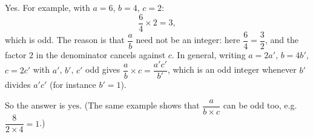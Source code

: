 Yes. For example, with $a=6$, $b=4$, $c=2$:
\[
\dfrac{6}{4}\times2=3,
\]
which is odd. The reason is that $\dfrac {a}{b}$ need not be an integer: here $\dfrac{6}{4}=\dfrac{3}{2}$, and the factor $2$ in the denominator cancels against $c$. In general, writing $a=2a'$, $b=4b'$, $c=2c'$ with $a'$, $b'$, $c'$ odd gives $\dfrac {a}{b}\times c=\dfrac{a'c'}{b'}$, which is an odd integer whenever $b'$ divides $a'c'$ (for instance $b'=1$).

So the answer is $\boxed{\text{yes}}$. (The same example shows that $\dfrac{a}{b\times c}$ can be odd too, e.g.\ $\dfrac{8}{2\times4}=1$.)
